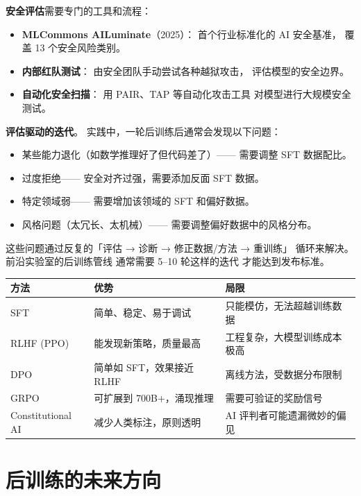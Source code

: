 \textbf{安全评估}需要专门的工具和流程：
\begin{itemize}[noitemsep]
  \item \textbf{MLCommons AILuminate}（2025）：
        首个行业标准化的 AI 安全基准，
        覆盖 13 个安全风险类别。
  \item \textbf{内部红队测试}：
        由安全团队手动尝试各种越狱攻击，
        评估模型的安全边界。
  \item \textbf{自动化安全扫描}：
        用 PAIR、TAP 等自动化攻击工具
        对模型进行大规模安全测试。
\end{itemize}

\textbf{评估驱动的迭代}。
实践中，一轮后训练后通常会发现以下问题：
\begin{itemize}[noitemsep]
  \item 某些能力退化（如数学推理好了但代码差了）——
        需要调整 SFT 数据配比。
  \item 过度拒绝——
        安全对齐过强，需要添加反面 SFT 数据。
  \item 特定领域弱——
        需要增加该领域的 SFT 和偏好数据。
  \item 风格问题（太冗长、太机械）——
        需要调整偏好数据中的风格分布。
\end{itemize}
这些问题通过反复的「评估 → 诊断 → 修正数据/方法 → 重训练」
循环来解决。
前沿实验室的后训练管线
通常需要 5--10 轮这样的迭代
才能达到发布标准。

\begin{corebox}[后训练方法对比]
\begin{tabularx}{\linewidth}{l X X}
\toprule
\textbf{方法} & \textbf{优势} & \textbf{局限} \\
\midrule
SFT & 简单、稳定、易于调试 & 只能模仿，无法超越训练数据 \\
RLHF (PPO) & 能发现新策略，质量最高 & 工程复杂，大模型训练成本极高 \\
DPO & 简单如 SFT，效果接近 RLHF & 离线方法，受数据分布限制 \\
GRPO & 可扩展到 700B+，涌现推理 & 需要可验证的奖励信号 \\
Constitutional AI & 减少人类标注，原则透明 & AI 评判者可能遗漏微妙的偏见 \\
\bottomrule
\end{tabularx}
\end{corebox}

\section{后训练的未来方向}

